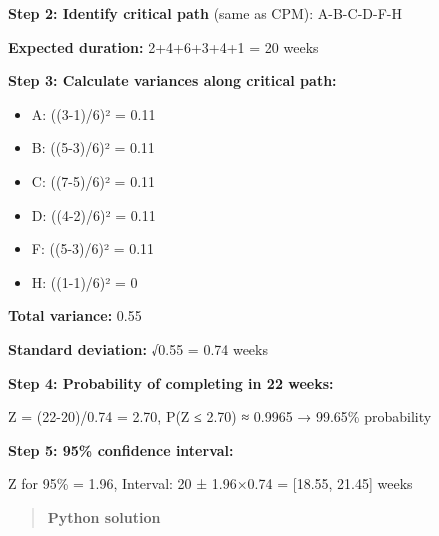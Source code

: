 \documentclass[
  letterpaper,
  DIV=11,
  numbers=noendperiod]{scrreprt}
\providecommand{\tightlist}{%
  \setlength{\itemsep}{0pt}\setlength{\parskip}{0pt}}
\begin{document}
\textbf{Step 2: Identify critical path} (same as CPM): A-B-C-D-F-H

\textbf{Expected duration:} 2+4+6+3+4+1 = 20 weeks

\textbf{Step 3: Calculate variances along critical path:}

\begin{itemize}
\tightlist
\item
  A: ((3-1)/6)² = 0.11
\item
  B: ((5-3)/6)² = 0.11
\item
  C: ((7-5)/6)² = 0.11
\item
  D: ((4-2)/6)² = 0.11
\item
  F: ((5-3)/6)² = 0.11
\item
  H: ((1-1)/6)² = 0
\end{itemize}

\textbf{Total variance:} 0.55

\textbf{Standard deviation:} √0.55 = 0.74 weeks

\textbf{Step 4: Probability of completing in 22 weeks:}

Z = (22-20)/0.74 = 2.70, P(Z ≤ 2.70) ≈ 0.9965 → 99.65\% probability

\textbf{Step 5: 95\% confidence interval:}

Z for 95\% = 1.96, Interval: 20 ± 1.96×0.74 = {[}18.55, 21.45{]} weeks

\begin{quote}
\textbf{Python solution}
\end{quote}
\end{document}
